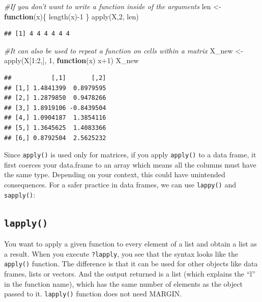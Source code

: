 \documentclass[
]{book}
\newenvironment{Shaded}{\begin{snugshade}}{\end{snugshade}}
\newcommand{\CommentTok}[1]{\textcolor[rgb]{0.56,0.35,0.01}{\textit{#1}}}
\newcommand{\ControlFlowTok}[1]{\textcolor[rgb]{0.13,0.29,0.53}{\textbf{#1}}}
\newcommand{\DecValTok}[1]{\textcolor[rgb]{0.00,0.00,0.81}{#1}}
\newcommand{\FunctionTok}[1]{\textcolor[rgb]{0.00,0.00,0.00}{#1}}
\newcommand{\NormalTok}[1]{#1}
\newcommand{\OtherTok}[1]{\textcolor[rgb]{0.56,0.35,0.01}{#1}}
\newcommand{\SpecialCharTok}[1]{\textcolor[rgb]{0.00,0.00,0.00}{#1}}
\begin{document}
\begin{Shaded}
\begin{Highlighting}[]
\CommentTok{\#If you don’t want to write a function inside of the arguments}
\NormalTok{len }\OtherTok{\textless{}{-}} \ControlFlowTok{function}\NormalTok{(x)\{}
  \FunctionTok{length}\NormalTok{(x)}\SpecialCharTok{{-}}\DecValTok{1}
\NormalTok{\}}
\FunctionTok{apply}\NormalTok{(X,}\DecValTok{2}\NormalTok{, len)}
\end{Highlighting}
\end{Shaded}

\begin{verbatim}
## [1] 4 4 4 4 4 4
\end{verbatim}

\begin{Shaded}
\begin{Highlighting}[]
\CommentTok{\#It can also be used to repeat a function on cells within a matrix}
\NormalTok{X\_new }\OtherTok{\textless{}{-}} \FunctionTok{apply}\NormalTok{(X[}\DecValTok{1}\SpecialCharTok{:}\DecValTok{2}\NormalTok{,], }\DecValTok{1}\NormalTok{, }\ControlFlowTok{function}\NormalTok{(x) x}\SpecialCharTok{+}\DecValTok{1}\NormalTok{)}
\NormalTok{X\_new}
\end{Highlighting}
\end{Shaded}

\begin{verbatim}
##           [,1]       [,2]
## [1,] 1.4841399  0.8979595
## [2,] 1.2879850  0.9478266
## [3,] 1.8919106 -0.8439504
## [4,] 1.0904187  1.3854116
## [5,] 1.3645625  1.4083366
## [6,] 0.8792504  2.5625232
\end{verbatim}

Since \texttt{apply()} is used only for matrices, if you apply \texttt{apply()} to a data frame, it first coerces your data.frame to an array which means all the columns must have the same type. Depending on your context, this could have unintended consequences. For a safer practice in data frames, we can use \texttt{lappy()} and \texttt{sapply()}:

\hypertarget{lapply}{%
\subsection{\texorpdfstring{\texttt{lapply()}}{lapply()}}\label{lapply}}

You want to apply a given function to every element of a list and obtain a list as a result. When you execute \texttt{?lapply}, you see that the syntax looks like the \texttt{apply()} function. The difference is that it can be used for other objects like data frames, lists or vectors. And the output returned is a list (which explains the ``l'' in the function name), which has the same number of elements as the object passed to it. \texttt{lapply()} function does not need MARGIN.
\end{document}
